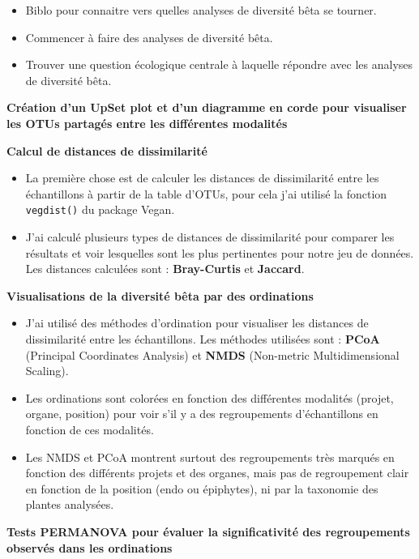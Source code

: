\documentclass[12pt,a4paper]{report}
\begin{document}
\begin{objectifs}
    \begin{itemize}
        \item Biblo pour connaitre vers quelles analyses de diversité bêta se tourner.
        \item Commencer à faire des analyses de diversité bêta.
        \item Trouver une question écologique centrale à laquelle répondre avec les analyses de diversité bêta.
    \end{itemize}
\end{objectifs}

\begin{Méthodologie}{}
    \textbf{Création d'un UpSet plot et d'un diagramme en corde pour visualiser les OTUs partagés entre les différentes modalités} 

    \textbf{Calcul de distances de dissimilarité}
    \begin{itemize}
        \item La première chose est de calculer les distances de dissimilarité entre les échantillons à partir de la table d'OTUs, pour cela j'ai utilisé la fonction \texttt{vegdist()} du package Vegan.
        \item J'ai calculé plusieurs types de distances de dissimilarité pour comparer les résultats et voir lesquelles sont les plus pertinentes pour notre jeu de données. Les distances calculées sont : \textbf{Bray-Curtis} et \textbf{Jaccard}.
    \end{itemize}   

    \textbf{Visualisations de la diversité bêta par des ordinations}
    \begin{itemize}
        \item J'ai utilisé des méthodes d'ordination pour visualiser les distances de dissimilarité entre les échantillons. Les méthodes utilisées sont : \textbf{PCoA} (Principal Coordinates Analysis) et \textbf{NMDS} (Non-metric Multidimensional Scaling).
        \item Les ordinations sont colorées en fonction des différentes modalités (projet, organe, position) pour voir s'il y a des regroupements d'échantillons en fonction de ces modalités.
        \item Les NMDS et PCoA montrent surtout des regroupements très marqués en fonction des différents projets et des organes, mais pas de regroupement clair en fonction de la position (endo ou épiphytes), ni par la taxonomie des plantes analysées.
    \end{itemize}   

    \textbf{Tests PERMANOVA pour évaluer la significativité des regroupements observés dans les ordinations}


\end{Méthodologie}
\end{document}
